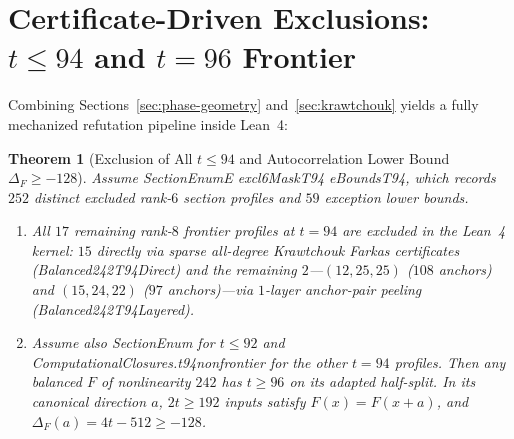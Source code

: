 \documentclass[11pt]{article}
\newtheorem{theorem}{Theorem}[section]
\theoremstyle{definition}
\newcommand{\code}[1]{{\ttfamily\small\renewcommand{\_}{\textunderscore\allowbreak}#1}}
\begin{document}
\section{Certificate-Driven Exclusions: $t \le 94$ and $t = 96$ Frontier}
\label{sec:exclusions}

Combining Sections~\ref{sec:phase-geometry} and~\ref{sec:krawtchouk} yields a fully mechanized refutation pipeline inside Lean~4:

\begin{theorem}[Exclusion of All $t \le 94$ and Autocorrelation Lower Bound $\Delta_F \ge -128$]
\label{thm:t94}
Assume \code{SectionEnumE excl6MaskT94 eBoundsT94}, which records $252$ distinct excluded rank-$6$ section profiles and $59$ exception lower bounds.
\begin{enumerate}[nosep]
  \item All $17$ remaining rank-$8$ frontier profiles at $t = 94$ are excluded in the Lean~4 kernel: $15$ directly via sparse all-degree Krawtchouk Farkas certificates (\code{Balanced242T94Direct}) and the remaining $2$---$(12, 25, 25)$ ($108$ anchors) and $(15, 24, 22)$ ($97$ anchors)---via $1$-layer anchor-pair peeling (\code{Balanced242T94Layered}).
  \item Assume also \code{SectionEnum} for $t\le92$ and \code{ComputationalClosures.t94\_nonfrontier} for the other $t=94$ profiles. Then any balanced $F$ of nonlinearity $242$ has $t\ge96$ on its adapted half-split. In its canonical direction $a$, $2t\ge192$ inputs satisfy $F(x)=F(x+a)$, and $\Delta_F(a)=4t-512\ge-128$.
\end{enumerate}
\end{theorem}
\end{document}
